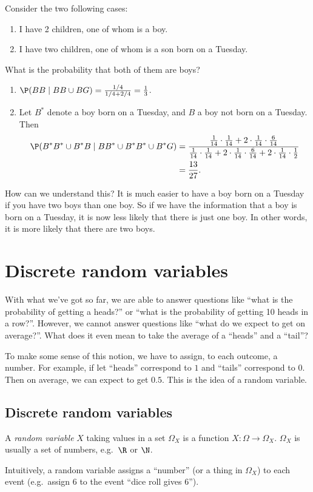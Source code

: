 \documentclass[a4paper]{article}
\begin{document}
\begin{eg}
  Consider the two following cases:
  \begin{enumerate}
    \item I have 2 children, one of whom is a boy.
    \item I have two children, one of whom is a son born on a Tuesday.
  \end{enumerate}
  What is the probability that both of them are boys?

  \begin{enumerate}
    \item $\P(BB\mid BB\cup BG) = \frac{1/4}{1/4 + 2/4} = \frac{1}{3}$.
    \item Let $B^*$ denote a boy born on a Tuesday, and $B$ a boy not born on a Tuesday. Then
      \begin{align*}
        \P(B^*B^* \cup B^*B\mid BB^* \cup B^*B^*\cup B^*G)&=\frac{\frac{1}{14}\cdot \frac{1}{14} + 2\cdot \frac{1}{14}\cdot\frac{6}{14}}{\frac{1}{14}\cdot \frac{1}{14} + 2\cdot \frac{1}{14}\cdot\frac{6}{14} + 2\cdot \frac{1}{14}\cdot \frac{1}{2}}\\
        &= \frac{13}{27}.
      \end{align*}
  \end{enumerate}
  How can we understand this? It is much easier to have a boy born on a Tuesday if you have two boys than one boy. So if we have the information that a boy is born on a Tuesday, it is now less likely that there is just one boy. In other words, it is more likely that there are two boys.
\end{eg}

\section{Discrete random variables}
With what we've got so far, we are able to answer questions like ``what is the probability of getting a heads?'' or ``what is the probability of getting 10 heads in a row?''. However, we cannot answer questions like ``what do we expect to get on average?''. What does it even mean to take the average of a ``heads'' and a ``tail''?

To make some sense of this notion, we have to assign, to each outcome, a number. For example, if let ``heads'' correspond to $1$ and ``tails'' correspond to $0$. Then on average, we can expect to get $0.5$. This is the idea of a random variable.

\subsection{Discrete random variables}
\begin{defi}
  A \emph{random variable} $X$ taking values in a set $\Omega_X$ is a function $X: \Omega \to \Omega_X$. $\Omega_X$ is usually a set of numbers, e.g.\ $\R$ or $\N$.
\end{defi}
Intuitively, a random variable assigns a ``number'' (or a thing in $\Omega_X$) to each event (e.g.\ assign $6$ to the event ``dice roll gives 6'').
\end{document}
